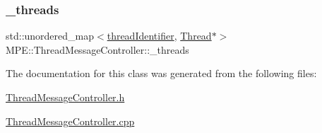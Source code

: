 \mbox{\label{class_m_p_e_1_1_thread_message_controller_ac93b25a09aeba30cfb4bbad12967f799}} 
\subsubsection{\texorpdfstring{\+\_\+threads}{\_threads}}
{\footnotesize\ttfamily std\+::unordered\+\_\+map$<$\hyperlink{namespace_m_p_e_a16447295e3105bd2ba2a9ea303566175}{thread\+Identifier}, \hyperlink{class_m_p_e_1_1_thread}{Thread}$\ast$$>$ M\+P\+E\+::\+Thread\+Message\+Controller\+::\+\_\+threads\hspace{0.3cm}{\ttfamily [private]}}



The documentation for this class was generated from the following files\+:\begin{DoxyCompactItemize}
\item 
\hyperlink{_thread_message_controller_8h}{Thread\+Message\+Controller.\+h}\item 
\hyperlink{_thread_message_controller_8cpp}{Thread\+Message\+Controller.\+cpp}\end{DoxyCompactItemize}
